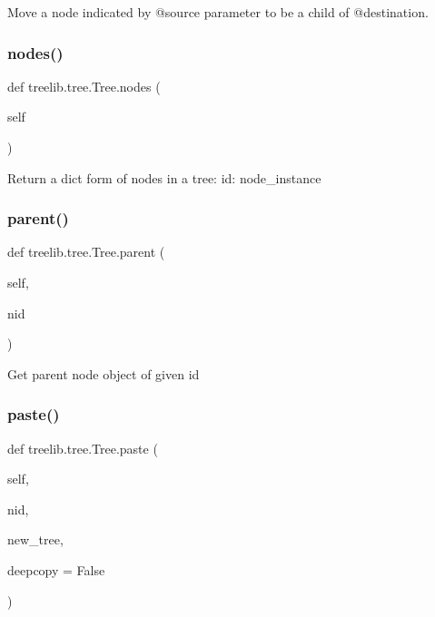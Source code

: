 \begin{DoxyVerb}Move a node indicated by @source parameter to be a child of
@destination.
\end{DoxyVerb}
 \mbox{\label{classtreelib_1_1tree_1_1Tree_a831a9ee3ed8a2e5da20853745cc92746}} 
\subsubsection{\texorpdfstring{nodes()}{nodes()}}
{\footnotesize\ttfamily def treelib.\+tree.\+Tree.\+nodes (\begin{DoxyParamCaption}\item[{}]{self }\end{DoxyParamCaption})}

\begin{DoxyVerb}Return a dict form of nodes in a tree: {id: node_instance}\end{DoxyVerb}
 \mbox{\label{classtreelib_1_1tree_1_1Tree_a5b3ff09f1a10d49460888cdfa2c5ac0d}} 
\subsubsection{\texorpdfstring{parent()}{parent()}}
{\footnotesize\ttfamily def treelib.\+tree.\+Tree.\+parent (\begin{DoxyParamCaption}\item[{}]{self,  }\item[{}]{nid }\end{DoxyParamCaption})}

\begin{DoxyVerb}Get parent node object of given id\end{DoxyVerb}
 \mbox{\label{classtreelib_1_1tree_1_1Tree_a33742dae375dba44d958e6f34f97ef1d}} 
\subsubsection{\texorpdfstring{paste()}{paste()}}
{\footnotesize\ttfamily def treelib.\+tree.\+Tree.\+paste (\begin{DoxyParamCaption}\item[{}]{self,  }\item[{}]{nid,  }\item[{}]{new\+\_\+tree,  }\item[{}]{deepcopy = {\ttfamily False} }\end{DoxyParamCaption})}

